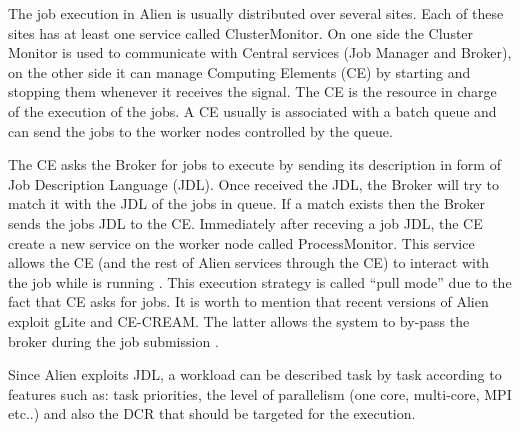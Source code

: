 The job execution in Alien is usually distributed over several sites. Each of these sites has at least one service called ClusterMonitor. On one side the Cluster Monitor is used to communicate with Central services (Job Manager and Broker), on the other side it can manage Computing Elements (CE) by starting and stopping them whenever it receives the signal.
The CE is the resource in charge of the execution of the jobs. A CE usually is associated with a batch queue and can send the jobs to the worker nodes controlled by the queue.

The CE asks the Broker for jobs to execute by sending its description in form of Job Description Language (JDL).
Once received the JDL, the Broker will try to match it with the JDL of the jobs in queue. If a match exists then the Broker sends the jobs JDL to the CE.
Immediately after receving a job JDL, the CE create a new service on the worker node called ProcessMonitor. This service allows the CE (and the rest of Alien services through the CE) to interact with the job while is running \cite{Saiz2003}. 
This execution strategy is called ``pull mode'' due to the fact that CE asks for jobs.
It is worth to mention that recent versions of Alien exploit gLite and CE-CREAM. The latter allows the system to by-pass the broker during the job submission \cite{Bagnasco2004}. 

Since Alien exploits JDL, a  workload can be described task by task according to features such as: task priorities, the level of parallelism (one core, multi-core, MPI etc..) and  also the DCR that should be targeted for the execution.


